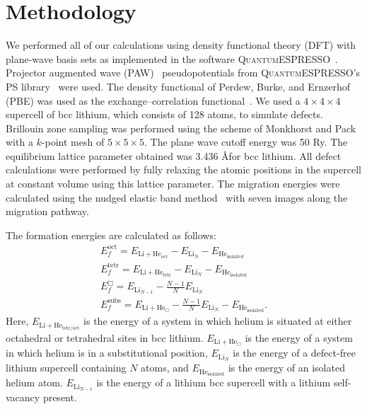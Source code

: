 \section{Methodology}
We performed all of our calculations using density functional theory (DFT) with
plane-wave basis sets as implemented in the software \textsc{QuantumESPRESSO}~\cite{giannozzi2009quantum}. Projector augmented wave
(PAW)~\cite{blochl1994projector} pseudopotentials from \textsc{QuantumESPRESSO}'s PS library~\cite{dal2014pseudopotentials,pp1} were used.
The density functional of Perdew, Burke, and Ernzerhof (PBE) was used as the
exchange--correlation functional~\cite{Perdew1996b, Perdew1997}. We used a
$4\times4\times4$ supercell of bcc lithium, which consists of 128 atoms, to
simulate defects. Brillouin zone sampling was performed using the scheme of
Monkhorst and Pack~\cite{monkhorst1976special} with a $k$-point mesh of
$5\times5\times5$. The plane wave cutoff energy was 50 Ry. The equilibrium
lattice parameter obtained was 3.436 \AA\@ for bcc lithium. All defect
calculations were performed by fully relaxing the atomic positions in the
supercell at constant volume using this lattice parameter.
The migration energies were calculated using the
nudged elastic band method~\cite{Jonsson1998, henkelman2000climbing,
    henkelman2000improved}
with seven images along the migration pathway.

The formation energies are calculated as follows:
\begin{subequations}
\begin{gather}
 E_{f}^{\text{oct}}  = E_{\text{Li}+\text{He}_{\text{oct}}} - E_{\text{Li}_N} - E_{\text{He}_{\text{isolated}}} \\
 E_{f}^{\text{tetr}} = E_{\text{Li}+\text{He}_{\text{tetr}}} - E_{\text{Li}_N} - E_{\text{He}_{\text{isolated}}} \\
 E_f^{\Box} = E_{\text{Li}_{N-1}} - \frac{N-1}{N} E_{\text{Li}_N} \\
 E_f^{\text{subs}} = E_{\text{Li}+\text{He}_{\Box}} - \frac{N-1}{N} E_{\text{Li}_N} - E_{\text{He}_{\text{isolated}}}.
\end{gather}
 \end{subequations}
Here, $E_{\text{Li}+\text{He}_{\text{tetr/oct}}}$ is the energy of a system in
which helium is situated at either octahedral or tetrahedral sites in bcc
lithium. $E_{\text{Li}+\text{He}_{\Box}}$ is the energy of a system in which
helium is in a substitutional position, $E_{\text{Li}_N}$ is the energy of a
defect-free lithium supercell containing $N$ atoms, and
$E_{\text{He}_{\text{isolated}}}$ is the energy of an isolated helium atom.
$E_{\text{Li}_{N-1}}$ is the energy of a lithium bcc supercell with a lithium
self-vacancy present.

